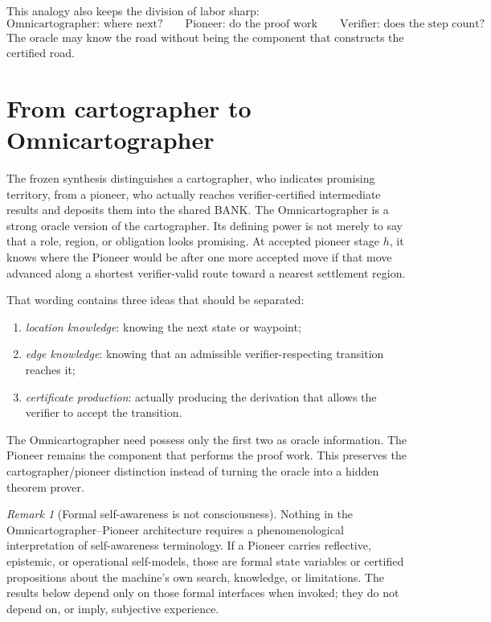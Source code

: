 \documentclass[11pt]{article}
\theoremstyle{remark}
\newtheorem{remark}[definition]{Remark}
\begin{document}
This analogy also keeps the division of labor sharp:
\[
\text{Omnicartographer: where next?}\qquad
\text{Pioneer: do the proof work}\qquad
\text{Verifier: does the step count?}
\]
The oracle may know the road without being the component that constructs the certified road.

\section{From cartographer to Omnicartographer}

The frozen synthesis distinguishes a cartographer, who indicates promising territory, from a pioneer, who actually reaches verifier-certified intermediate results and deposits them into the shared BANK. The Omnicartographer is a strong oracle version of the cartographer. Its defining power is not merely to say that a role, region, or obligation looks promising. At accepted pioneer stage $h$, it knows where the Pioneer would be after one more accepted move if that move advanced along a shortest verifier-valid route toward a nearest settlement region.

That wording contains three ideas that should be separated:
\begin{enumerate}[label=(\roman*)]
\item \emph{location knowledge}: knowing the next state or waypoint;
\item \emph{edge knowledge}: knowing that an admissible verifier-respecting transition reaches it;
\item \emph{certificate production}: actually producing the derivation that allows the verifier to accept the transition.
\end{enumerate}
The Omnicartographer need possess only the first two as oracle information. The Pioneer remains the component that performs the proof work. This preserves the cartographer/pioneer distinction instead of turning the oracle into a hidden theorem prover.

\begin{remark}[Formal self-awareness is not consciousness]
Nothing in the Omnicartographer--Pioneer architecture requires a phenomenological interpretation of self-awareness terminology. If a Pioneer carries reflective, epistemic, or operational self-models, those are formal state variables or certified propositions about the machine's own search, knowledge, or limitations. The results below depend only on those formal interfaces when invoked; they do not depend on, or imply, subjective experience.
\end{remark}
\end{document}
